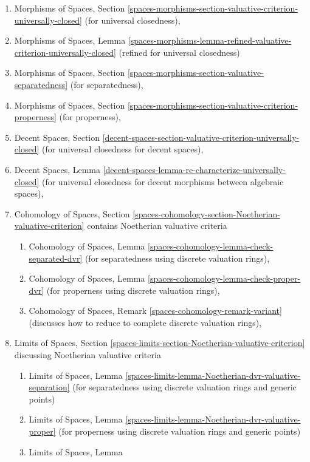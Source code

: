 \documentclass{stacks-project}
\theoremstyle{plain}
\theoremstyle{definition}
\theoremstyle{remark}
\numberwithin{equation}{subsection}
\begin{document}
\begin{enumerate}
\item Morphisms of Spaces, Section
\ref{spaces-morphisms-section-valuative-criterion-universally-closed}
(for universal closedness),
\item Morphisms of Spaces, Lemma
\ref{spaces-morphisms-lemma-refined-valuative-criterion-universally-closed}
(refined for universal closedness)
\item Morphisms of Spaces, Section
\ref{spaces-morphisms-section-valuative-separatedness}
(for separatedness),
\item Morphisms of Spaces, Section
\ref{spaces-morphisms-section-valuative-criterion-properness}
(for properness),
\item Decent Spaces, Section
\ref{decent-spaces-section-valuative-criterion-universally-closed}
(for universal closedness for decent spaces),
\item Decent Spaces, Lemma
\ref{decent-spaces-lemma-re-characterize-universally-closed}
(for universal closedness for decent morphisms between algebraic spaces),
\item Cohomology of Spaces, Section
\ref{spaces-cohomology-section-Noetherian-valuative-criterion}
contains Noetherian valuative criteria
\begin{enumerate}
\item Cohomology of Spaces, Lemma
\ref{spaces-cohomology-lemma-check-separated-dvr}
(for separatedness using discrete valuation rings),
\item Cohomology of Spaces, Lemma
\ref{spaces-cohomology-lemma-check-proper-dvr}
(for properness using discrete valuation rings),
\item Cohomology of Spaces, Remark
\ref{spaces-cohomology-remark-variant}
(discusses how to reduce to complete discrete valuation rings),
\end{enumerate}
\item Limits of Spaces, Section
\ref{spaces-limits-section-Noetherian-valuative-criterion}
discussing Noetherian valuative criteria
\begin{enumerate}
\item Limits of Spaces, Lemma
\ref{spaces-limits-lemma-Noetherian-dvr-valuative-separation}
(for separatedness using discrete valuation rings and generic points)
\item Limits of Spaces, Lemma
\ref{spaces-limits-lemma-Noetherian-dvr-valuative-proper}
(for properness using discrete valuation rings and generic points)
\item Limits of Spaces, Lemma

\end{enumerate}
\end{enumerate}
\end{document}
